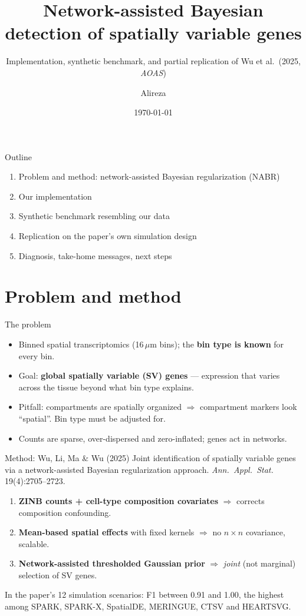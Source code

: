 \documentclass[aspectratio=169,11pt]{beamer}
\title[NABR for spatially variable genes]{Network-assisted Bayesian detection of spatially variable genes}
\subtitle{Implementation, synthetic benchmark, and partial replication of Wu et al.\ (2025, \emph{AOAS})}
\author{Alireza}   %
\institute{Lab meeting}
\date{\today}
\begin{document}
\begin{frame}
  \titlepage
\end{frame}

\begin{frame}{Outline}
  \begin{enumerate}
    \item Problem and method: network-assisted Bayesian regularization (NABR)
    \item Our implementation
    \item Synthetic benchmark resembling our data
    \item Replication on the paper's own simulation design
    \item Diagnosis, take-home messages, next steps
  \end{enumerate}
\end{frame}

\section{Problem and method}

\begin{frame}{The problem}
  \begin{itemize}
    \item Binned spatial transcriptomics (16\,$\mu$m bins); the \textbf{bin type is known} for every bin.
    \item Goal: \textbf{global spatially variable (SV) genes} --- expression that varies across the tissue
          beyond what bin type explains.
    \item Pitfall: compartments are spatially organized $\Rightarrow$ compartment markers look ``spatial''.
          Bin type must be adjusted for.
    \item Counts are sparse, over-dispersed and zero-inflated; genes act in networks.
  \end{itemize}
\end{frame}

\begin{frame}{Method: Wu, Li, Ma \& Wu (2025)}
  \small Joint identification of spatially variable genes via a network-assisted Bayesian regularization
  approach. \emph{Ann.\ Appl.\ Stat.} 19(4):2705--2723.
  \normalsize
  \begin{enumerate}
    \item \textbf{ZINB counts + cell-type composition covariates} $\Rightarrow$ corrects composition confounding.
    \item \textbf{Mean-based spatial effects} with fixed kernels $\Rightarrow$ no $n\times n$ covariance, scalable.
    \item \textbf{Network-assisted thresholded Gaussian prior} $\Rightarrow$ \emph{joint} (not marginal)
          selection of SV genes.
  \end{enumerate}
  \vspace{2mm}
  In the paper's 12 simulation scenarios: F1 between 0.91 and 1.00, the highest among SPARK, SPARK-X,
  SpatialDE, MERINGUE, CTSV and HEARTSVG.
\end{frame}
\end{document}

